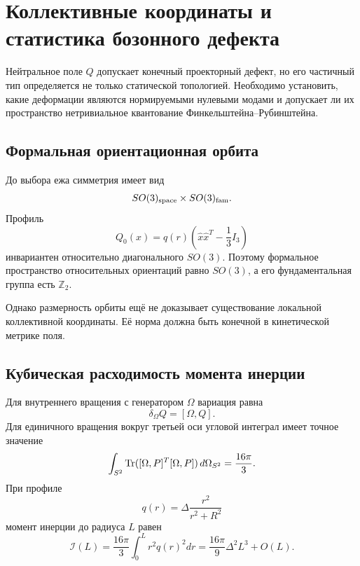 \chapter{Коллективные координаты и статистика бозонного дефекта}

Нейтральное поле $Q$ допускает конечный проекторный дефект, но его
частичный тип определяется не только статической топологией. Необходимо
установить, какие деформации являются нормируемыми нулевыми модами и
допускает ли их пространство нетривиальное квантование
Финкельштейна--Рубинштейна.

\section{Формальная ориентационная орбита}

До выбора ежа симметрия имеет вид
\begin{equation}
 SO(3)_{\rm space}\times SO(3)_{\rm fam}.
\end{equation}
Профиль
\begin{equation}
 Q_0(x)=q(r)\left(\hat x\hat x^T-\frac13I_3\right)
\end{equation}
инвариантен относительно диагонального $SO(3)$. Поэтому формальное
пространство относительных ориентаций равно $SO(3)$, а его фундаментальная
группа есть $\mathbb Z_2$.

Однако размерность орбиты ещё не доказывает существование локальной
коллективной координаты. Её норма должна быть конечной в кинетической
метрике поля.

\section{Кубическая расходимость момента инерции}

Для внутреннего вращения с генератором $\Omega$ вариация равна
\begin{equation}
 \delta_\Omega Q=[\Omega,Q].
\end{equation}
Для единичного вращения вокруг третьей оси угловой интеграл имеет точное
значение
\begin{equation}
 \int_{S^2}\operatorname{Tr}([\Omega,P]^T[\Omega,P])\,d\Omega_{S^2}
 =\frac{16\pi}{3}.
\end{equation}
При профиле
\begin{equation}
 q(r)=\Delta\frac{r^2}{r^2+R^2}
\end{equation}
момент инерции до радиуса $L$ равен
\begin{equation}
 \mathcal I(L)=\frac{16\pi}{3}\int_0^Lr^2q(r)^2dr
 =\frac{16\pi}{9}\Delta^2L^3+O(L).
 \label{eq:v6-bosonic-orientation-inertia}
\end{equation}

